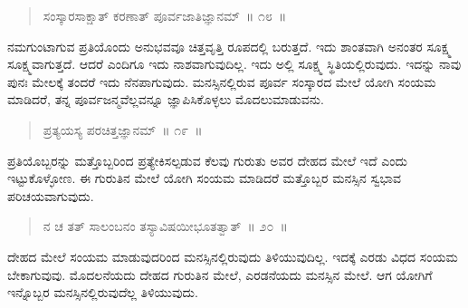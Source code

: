 \begin{verse}
ಸಂಸ್ಕಾರಸಾಕ್ಷಾತ್​‌ ಕರಣಾತ್​ ಪೂರ್ವಜಾತಿಜ್ಞಾನಮ್​~॥ ೧೮~॥
\end{verse}

\vspace{-0.4cm}


\vskip 0.2cm

ನಮಗುಂಟಾಗುವ ಪ್ರತಿಯೊಂದು ಅನುಭವವೂ ಚಿತ್ತವೃತ್ತಿ ರೂಪದಲ್ಲಿ ಬರುತ್ತದೆ. ಇದು ಶಾಂತವಾಗಿ ಅನಂತರ ಸೂಕ್ಷ್ಮ ಸೂಕ್ಷ್ಮವಾಗುತ್ತದೆ. ಆದರೆ ಎಂದಿಗೂ ಇದು ನಾಶವಾಗುವುದಿಲ್ಲ. ಇದು ಅಲ್ಲಿ ಸೂಕ್ಷ್ಮ ಸ್ಥಿತಿಯಲ್ಲಿರುವುದು. ಇದನ್ನು ನಾವು ಪುನಃ ಮೇಲಕ್ಕೆ ತಂದರೆ ಇದು ನೆನಪಾಗುವುದು. ಮನಸ್ಸಿನಲ್ಲಿರುವ ಪೂರ್ವ ಸಂಸ್ಕಾರದ ಮೇಲೆ ಯೋಗಿ ಸಂಯಮ ಮಾಡಿದರೆ, ತನ್ನ ಪೂರ್ವಜನ್ಮವೆಲ್ಲವನ್ನೂ ಜ್ಞಾಪಿಸಿಕೊಳ್ಳಲು ಮೊದಲುಮಾಡುವನು. 


\vspace{-0.3cm}


\begin{verse}
ಪ್ರತ್ಯಯಸ್ಯ ಪರಚಿತ್ತಜ್ಞಾನಮ್​~॥ ೧೯~॥
\end{verse}

\vspace{-0.4cm}


\vspace{0.1cm}

ಪ್ರತಿಯೊಬ್ಬರನ್ನು ಮತ್ತೊಬ್ಬರಿಂದ ಪ್ರತ್ಯೇಕಿಸಲ್ಪಡುವ ಕೆಲವು ಗುರುತು ಅವರ ದೇಹದ ಮೇಲೆ ಇದೆ ಎಂದು ಇಟ್ಟುಕೊಳ್ಳೋಣ. ಈ ಗುರುತಿನ ಮೇಲೆ ಯೋಗಿ ಸಂಯಮ ಮಾಡಿದರೆ ಮತ್ತೊಬ್ಬರ ಮನಸ್ಸಿನ ಸ್ವಭಾವ ಪರಿಚಯವಾಗುವುದು. 

\vspace{-0.2cm}

\begin{verse}
ನ ಚ ತತ್​ ಸಾಲಂಬನಂ ತಸ್ಯಾವಿಷಯೀಭೂತತ್ವಾತ್​~॥ ೨೦~॥
\end{verse}

\vspace{-0.4cm}


\vspace{0.2cm}

ದೇಹದ ಮೇಲೆ ಸಂಯಮ ಮಾಡುವುದರಿಂದ ಮನಸ್ಸಿನಲ್ಲಿರುವುದು ತಿಳಿಯುವುದಿಲ್ಲ. ಇದಕ್ಕೆ ಎರಡು ವಿಧದ ಸಂಯಮ ಬೇಕಾಗುವುವು. ಮೊದಲನೆಯದು ದೇಹದ ಗುರುತಿನ ಮೇಲೆ, ಎರಡನೆಯದು ಮನಸ್ಸಿನ ಮೇಲೆ. ಆಗ ಯೋಗಿಗೆ ಇನ್ನೊಬ್ಬರ ಮನಸ್ಸಿನಲ್ಲಿರುವುದೆಲ್ಲ ತಿಳಿಯುವುದು. 

\vspace{-0.3cm}

